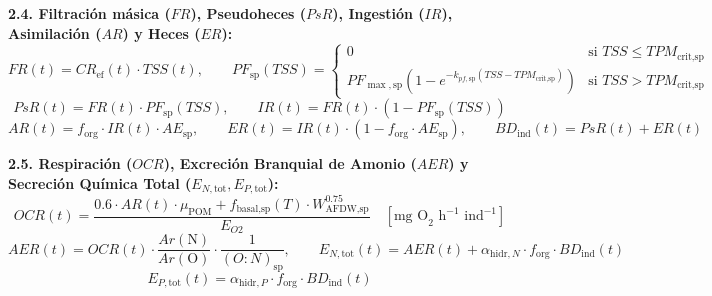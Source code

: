 \documentclass[11pt,letterpaper]{article}
\begin{document}
\begin{formulabox}
\textbf{2.4. Filtración másica ($FR$), Pseudoheces ($PsR$), Ingestión ($IR$), Asimilación ($AR$) y Heces ($ER$):}
\begin{equation}
FR(t) = CR_{\text{ef}}(t) \cdot TSS(t), \qquad PF_{\text{sp}}(TSS) = \begin{cases} 0 & \text{si } TSS \le TPM_{\text{crit,sp}} \\ PF_{\max,\text{sp}}\left(1 - e^{-k_{pf,\text{sp}}(TSS - TPM_{\text{crit,sp}})}\right) & \text{si } TSS > TPM_{\text{crit,sp}} \end{cases}
\label{eq:fr}
\end{equation}
\begin{equation}
PsR(t) = FR(t) \cdot PF_{\text{sp}}(TSS), \qquad IR(t) = FR(t) \cdot \left(1 - PF_{\text{sp}}(TSS)\right)
\label{eq:psr}
\end{equation}
\begin{equation}
AR(t) = f_{\text{org}} \cdot IR(t) \cdot AE_{\text{sp}}, \qquad ER(t) = IR(t) \cdot \left(1 - f_{\text{org}} \cdot AE_{\text{sp}}\right), \qquad BD_{\text{ind}}(t) = PsR(t) + ER(t)
\label{eq:er}
\end{equation}

\textbf{2.5. Respiración ($OCR$), Excreción Branquial de Amonio ($AER$) y Secreción Química Total ($E_{N,\text{tot}}, E_{P,\text{tot}}$):}
\begin{equation}
OCR(t) = \frac{0.6 \cdot AR(t) \cdot \mu_{\text{POM}} + f_{\text{basal,sp}}(T) \cdot W_{\text{AFDW,sp}}^{0.75}}{E_{O2}} \quad [\text{mg O}_2\text{ h}^{-1}\text{ ind}^{-1}]
\label{eq:ocr}
\end{equation}
\begin{equation}
AER(t) = OCR(t) \cdot \frac{Ar(\text{N})}{Ar(\text{O})} \cdot \frac{1}{(O:N)_{\text{sp}}}, \qquad E_{N,\text{tot}}(t) = AER(t) + \alpha_{\text{hidr},N} \cdot f_{\text{org}} \cdot BD_{\text{ind}}(t)
\label{eq:aer}
\end{equation}
\begin{equation}
E_{P,\text{tot}}(t) = \alpha_{\text{hidr},P} \cdot f_{\text{org}} \cdot BD_{\text{ind}}(t)
\label{eq:entot}
\end{equation}
\end{formulabox}
\end{document}
